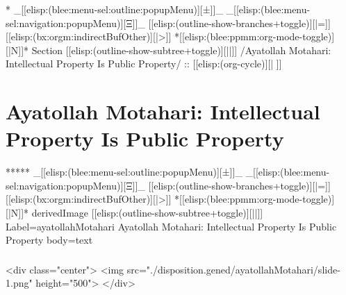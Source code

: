 \begin{whenOrg}
\begin{verblatex}
\begin{frame}[fragile,plain,label=ayatollahKhomeini]

\end{frame}
\end{verblatex}


\begin{whenOrg}
*  _[[elisp:(blee:menu-sel:outline:popupMenu)][±]]_ _[[elisp:(blee:menu-sel:navigation:popupMenu)][Ξ]]_ [[elisp:(outline-show-branches+toggle)][|=]] [[elisp:(bx:orgm:indirectBufOther)][|>]] *[[elisp:(blee:ppmm:org-mode-toggle)][|N]]*  Section    [[elisp:(outline-show-subtree+toggle)][||]]   /Ayatollah Motahari: Intellectual Property Is Public Property/ ::  [[elisp:(org-cycle)][| ]]
\end{whenOrg}

\section{Ayatollah Motahari: Intellectual Property Is Public Property}


\begin{whenOrg}
*****  _[[elisp:(blee:menu-sel:outline:popupMenu)][±]]_ _[[elisp:(blee:menu-sel:navigation:popupMenu)][Ξ]]_ [[elisp:(outline-show-branches+toggle)][|=]] [[elisp:(bx:orgm:indirectBufOther)][|>]] *[[elisp:(blee:ppmm:org-mode-toggle)][|N]]*  derivedImage [[elisp:(outline-show-subtree+toggle)][||]] Label=ayatollahMotahari Ayatollah Motahari: Intellectual Property Is Public Property body=text
\end{whenOrg}

\begin{htmlonly}

\begin{frame}[fragile,plain,label=ayatollahMotahari]
    \frametitle{}
    \framesubtitle{}
    \begin{rawhtml}
<div class="center">
<img src="./disposition.gened/ayatollahMotahari/slide-1.png" height="500">
</div>
    \end{rawhtml}
\end{frame}
\end{htmlonly}


\end{whenOrg}
